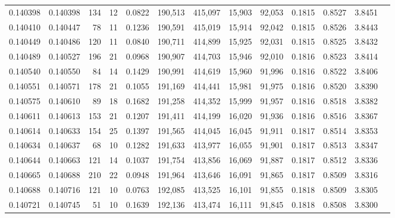 \begin{tabular}{rrrrrrrrrrrrr}
0.140398 & 0.140398 &   134 &  12 &                                     0.0822 & 190,513 & 415,097 &  15,903 &  92,053 & 0.1815 & 0.8527 & 3.8451 \\
0.140410 & 0.140447 &    78 &  11 &                                     0.1236 & 190,591 & 415,019 &  15,914 &  92,042 & 0.1815 & 0.8526 & 3.8443 \\
0.140449 & 0.140486 &   120 &  11 &                                     0.0840 & 190,711 & 414,899 &  15,925 &  92,031 & 0.1815 & 0.8525 & 3.8432 \\
0.140489 & 0.140527 &   196 &  21 &                                     0.0968 & 190,907 & 414,703 &  15,946 &  92,010 & 0.1816 & 0.8523 & 3.8414 \\
0.140540 & 0.140550 &    84 &  14 &                                     0.1429 & 190,991 & 414,619 &  15,960 &  91,996 & 0.1816 & 0.8522 & 3.8406 \\
0.140551 & 0.140571 &   178 &  21 &                                     0.1055 & 191,169 & 414,441 &  15,981 &  91,975 & 0.1816 & 0.8520 & 3.8390 \\
0.140575 & 0.140610 &    89 &  18 &                                     0.1682 & 191,258 & 414,352 &  15,999 &  91,957 & 0.1816 & 0.8518 & 3.8382 \\
0.140611 & 0.140613 &   153 &  21 &                                     0.1207 & 191,411 & 414,199 &  16,020 &  91,936 & 0.1816 & 0.8516 & 3.8367 \\
0.140614 & 0.140633 &   154 &  25 &                                     0.1397 & 191,565 & 414,045 &  16,045 &  91,911 & 0.1817 & 0.8514 & 3.8353 \\
0.140634 & 0.140637 &    68 &  10 &                                     0.1282 & 191,633 & 413,977 &  16,055 &  91,901 & 0.1817 & 0.8513 & 3.8347 \\
0.140644 & 0.140663 &   121 &  14 &                                     0.1037 & 191,754 & 413,856 &  16,069 &  91,887 & 0.1817 & 0.8512 & 3.8336 \\
0.140665 & 0.140688 &   210 &  22 &                                     0.0948 & 191,964 & 413,646 &  16,091 &  91,865 & 0.1817 & 0.8509 & 3.8316 \\
0.140688 & 0.140716 &   121 &  10 &                                     0.0763 & 192,085 & 413,525 &  16,101 &  91,855 & 0.1818 & 0.8509 & 3.8305 \\
0.140721 & 0.140745 &    51 &  10 &                                     0.1639 & 192,136 & 413,474 &  16,111 &  91,845 & 0.1818 & 0.8508 & 3.8300 \\

\end{tabular}
